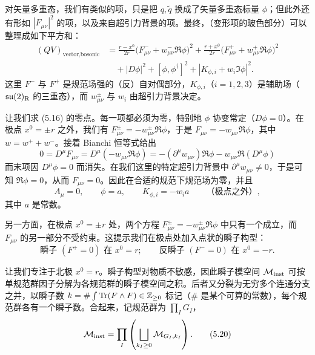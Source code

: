 对矢量多重态，我们有类似的项，只是把 $q,\tilde{q}$ 换成了矢量多重态标量 $\phi$；但此外还有形如 $|F_{\mu\nu}|^2$ 的项，以及来自超引力背景的项。最终，（变形项的玻色部分）可以整理成如下平方和：
\begin{equation}
\begin{aligned}
  (QV)_{\text{vector,bosonic}}
  &=\frac{r-x^0}{2r}\big(F^-_{\mu\nu}+w^-_{\mu\nu}\Re\phi\big)^2
   +\frac{r+x^0}{2r}\big(F^+_{\mu\nu}+w^+_{\mu\nu}\Re\phi\big)^2\\
  &\quad+|D\phi|^2+[\phi,\phi^\dagger]^2+|K_{\phi,i}+w_i\Im\phi|^2.
\end{aligned}
  \tag{5.16}
\end{equation}
这里 $F^-$ 与 $F^+$ 是规范场强的（反）自对偶部分，$K_{\phi,i}$（$i=1,2,3$）是辅助场（$\mathfrak{su}(2)_{\mathrm{R}}$ 的三重态），而 $w^\pm_{\mu\nu}$ 与 $w_i$ 由超引力背景决定。

让我们求 (5.16) 的零点。每一项都必须为零，特别地 $\phi$ 协变常定（$D\phi=0$）。在极点 $x^0=\pm r$ 之外，我们有 $F^\pm_{\mu\nu}=-w^\pm_{\mu\nu}\Re\phi$，于是 $F_{\mu\nu}=-w_{\mu\nu}\Re\phi$，其中 $w=w^++w^-$。接着 Bianchi 恒等式给出
\begin{equation}
  0=D^\mu F_{\mu\nu}=D^\mu(-w_{\mu\nu}\Re\phi)
  =-(\partial^\mu w_{\mu\nu})\Re\phi-w_{\mu\nu}\Re(D^\mu\phi)
  \tag{5.17}
\end{equation}
而末项因 $D^\mu\phi=0$ 而消失。在我们这里的特定超引力背景中 $\partial^\mu w_{\mu\nu}\ne0$，于是可知 $\Re\phi=0$，从而 $F_{\mu\nu}=0$。因此在合适的规范下规范场为零，并且
\begin{equation}
  A_\mu=0,\qquad \phi=a,\qquad K_{\phi,i}=-w_i a
  \qquad\text{（极点之外）},
  \tag{5.18}
\end{equation}
其中 $a$ 是常数。


另一方面，在极点 $x^0=\pm r$ 处，两个方程 $F^\pm_{\mu\nu}=-w^\pm_{\mu\nu}\Re\phi$ 中只有一个成立，而 $F_{\mu\nu}$ 的另一部分不受约束。这提示我们在极点处加入点状的瞬子构型：
\begin{equation}
  \text{瞬子 }(F^+=0)\text{ 在 }x^0=r;\qquad
  \text{反瞬子 }(F^-=0)\text{ 在 }x^0=-r.
  \tag{5.19}
\end{equation}

让我们专注于北极 $x^0=r$。瞬子构型对物质不敏感，因此瞬子模空间 $\mathcal{M}_{\text{inst}}$ 可按单规范群因子分解为各规范群的瞬子模空间之积。后者又分裂为无穷多个连通分支之并，以瞬子数 $k=\#\int\operatorname{Tr}(F\wedge F)\in\mathbb{Z}_{\ge0}$ 标记（$\#$ 是某个可算的常数），每个规范群各有一个瞬子数。合起来，记规范群为 $\prod_I G_I$，
\begin{equation}
  \mathcal{M}_{\text{inst}}=\prod_I\left(\bigsqcup_{k_I\ge0}\mathcal{M}_{G_I,k_I}\right).
  \tag{5.20}
\end{equation}

